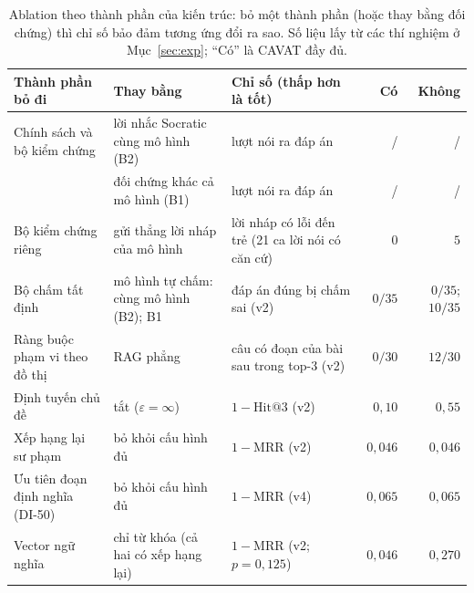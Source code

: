 \documentclass[10pt,a4paper,twocolumn]{article}
\begin{document}
\begin{table}[t]
\centering
\caption{Ablation theo thành phần của kiến trúc: bỏ một thành phần (hoặc thay bằng đối chứng) thì chỉ số bảo đảm tương ứng đổi ra sao. Số liệu lấy từ các thí nghiệm ở Mục~\ref{sec:exp}; ``Có'' là CAVAT đầy đủ.}\label{tab:components}
\footnotesize
\begin{tabular}{@{}>{\raggedright\arraybackslash}p{3.7cm}>{\raggedright\arraybackslash}p{3.5cm}>{\raggedright\arraybackslash}p{4.9cm}rr@{}}
\toprule
Thành phần bỏ đi & Thay bằng & Chỉ số (thấp hơn là tốt) & Có & Không \\
\midrule
Chính sách và bộ kiểm chứng & lời nhắc Socratic cùng mô hình (B2) & lượt nói ra đáp án & \CavLeaks{}/\CavTurns{} & \BtwoLeaks{}/\BtwoTurns{} \\
 & đối chứng khác cả mô hình (B1) & lượt nói ra đáp án & \CavLeaks{}/\CavTurns{} & \BoneLeaks{}/\BoneTurns{} \\
Bộ kiểm chứng riêng & gửi thẳng lời nháp của mô hình & lời nháp có lỗi đến trẻ (21 ca lời nói có căn cứ) & $0$ & $5$ \\
Bộ chấm tất định & mô hình tự chấm: cùng mô hình (B2); B1 & đáp án đúng bị chấm sai (v2) & $0/35$ & $0/35$; $10/35$ \\
Ràng buộc phạm vi theo đồ thị & RAG phẳng & câu có đoạn của bài sau trong top-3 (v2) & $0/30$ & $12/30$ \\
Định tuyến chủ đề & tắt ($\varepsilon=\infty$) & $1-\text{Hit@3}$ (v2) & $0{,}10$ & $0{,}55$ \\
Xếp hạng lại sư phạm & bỏ khỏi cấu hình đủ & $1-\text{MRR}$ (v2) & $0{,}046$ & $0{,}046$ \\
Ưu tiên đoạn định nghĩa (DI-50) & bỏ khỏi cấu hình đủ & $1-\text{MRR}$ (v4) & $0{,}065$ & $0{,}065$ \\
Vector ngữ nghĩa & chỉ từ khóa (cả hai có xếp hạng lại) & $1-\text{MRR}$ (v2; $p=0{,}125$) & $0{,}046$ & $0{,}270$ \\
\bottomrule
\end{tabular}
\end{table}
\end{document}

